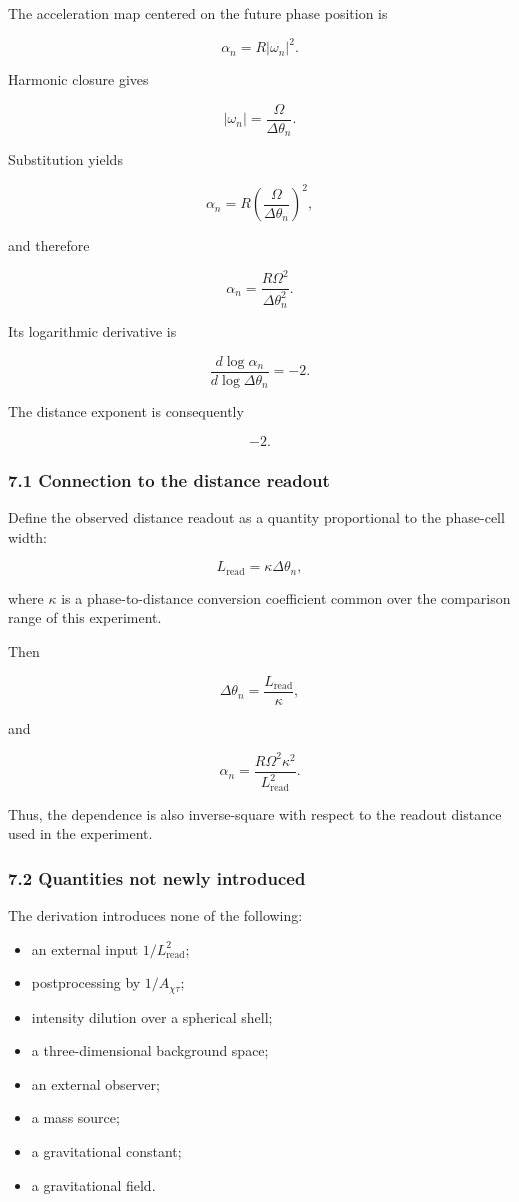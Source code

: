 \documentclass[
  10pt,
  a4paper,
]{article}
\newcounter{none} %
\providecommand{\tightlist}{%
  \setlength{\itemsep}{0pt}\setlength{\parskip}{0pt}}
\begin{document}
The acceleration map centered on the future phase position is

\[
\alpha_n=R|\omega_n|^2.
\]

Harmonic closure gives

\[
|\omega_n|
=\frac{\Omega}{\Delta\theta_n}.
\]

Substitution yields

\[
\alpha_n
=R\left(\frac{\Omega}{\Delta\theta_n}\right)^2,
\]

and therefore

\[
\boxed{
\alpha_n
=\frac{R\Omega^2}{\Delta\theta_n^2}
}.
\]

Its logarithmic derivative is

\[
\frac{d\log\alpha_n}
{d\log\Delta\theta_n}
=-2.
\]

The distance exponent is consequently

\[
\boxed{-2}.
\]

\subsubsection{7.1 Connection to the distance
readout}\label{connection-to-the-distance-readout}

Define the observed distance readout as a quantity proportional to the
phase-cell width:

\[
L_{\mathrm{read}}
=\kappa\Delta\theta_n,
\]

where \(\kappa\) is a phase-to-distance conversion coefficient common
over the comparison range of this experiment.

Then

\[
\Delta\theta_n
=\frac{L_{\mathrm{read}}}{\kappa},
\]

and

\[
\boxed{
\alpha_n
=\frac{R\Omega^2\kappa^2}
{L_{\mathrm{read}}^2}
}.
\]

Thus, the dependence is also inverse-square with respect to the readout
distance used in the experiment.

\subsubsection{7.2 Quantities not newly
introduced}\label{quantities-not-newly-introduced}

The derivation introduces none of the following:

\begin{itemize}
\tightlist
\item
  an external input \(1/L_{\mathrm{read}}^2\);
\item
  postprocessing by \(1/A_{\chi\tau}\);
\item
  intensity dilution over a spherical shell;
\item
  a three-dimensional background space;
\item
  an external observer;
\item
  a mass source;
\item
  a gravitational constant;
\item
  a gravitational field.
\end{itemize}
\end{document}
